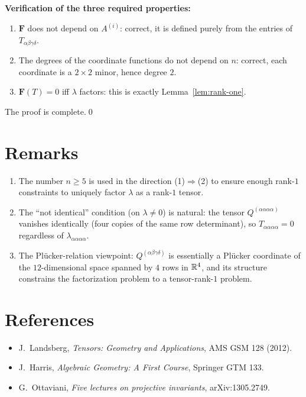 \textbf{Verification of the three required properties:}

\begin{enumerate}
\item $\mathbf F$ does not depend on $A^{(i)}$: correct, it is defined purely from the entries of $T_{\alpha\beta\gamma\delta}$.

\item The degrees of the coordinate functions do not depend on $n$: correct, each coordinate is a $2\times 2$ minor, hence degree $2$.

\item $\mathbf F(T)=0$ iff $\lambda$ factors: this is exactly Lemma~\ref{lem:rank-one}.
\end{enumerate}

The proof is complete.\qed

\section{Remarks}

\begin{enumerate}
\item The number $n\geq 5$ is used in the direction (1)$\Rightarrow$(2) to ensure enough rank-$1$ constraints to uniquely factor $\lambda$ as a rank-$1$ tensor.
\item The ``not identical'' condition (on $\lambda\neq 0$) is natural: the tensor $Q^{(\alpha\alpha\alpha\alpha)}$ vanishes identically (four copies of the same row determinant), so $T_{\alpha\alpha\alpha\alpha}=0$ regardless of $\lambda_{\alpha\alpha\alpha\alpha}$.
\item The Plücker-relation viewpoint: $Q^{(\alpha\beta\gamma\delta)}$ is essentially a Plücker coordinate of the $12$-dimensional space spanned by $4$ rows in $\mathbb{R}^4$, and its structure constrains the factorization problem to a tensor-rank-$1$ problem.
\end{enumerate}

\section*{References}
\begin{itemize}\setlength\itemsep{0.2em}
\item J.~Landsberg, \emph{Tensors: Geometry and Applications}, AMS GSM 128 (2012).
\item J.~Harris, \emph{Algebraic Geometry: A First Course}, Springer GTM 133.
\item G.~Ottaviani, \emph{Five lectures on projective invariants}, arXiv:1305.2749.
\end{itemize}


